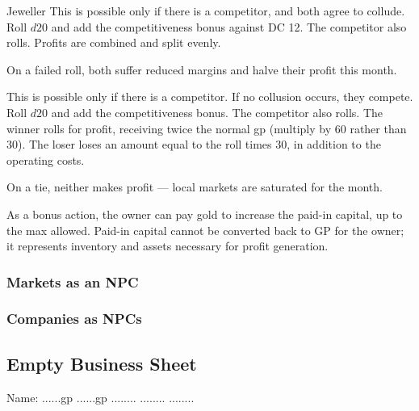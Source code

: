 \documentclass[twocolumn]{dndbook}
\begin{document}
\begin{DndMonster}[width=.5\textwidth - 8pt]{Jeweller}
	This is possible only if there is a competitor, and both agree to collude.
	Roll $d20$ and add the competitiveness bonus against DC 12.
	The competitor also rolls. Profits are combined and split evenly.\par
	On a failed roll, both suffer reduced margins and halve their profit this month.

	This is possible only if there is a competitor. If no collusion occurs, they compete.
	Roll $d20$ and add the competitiveness bonus.
	The competitor also rolls.
	The winner rolls for profit, receiving twice the normal gp (multiply by 60 rather than 30).
	The loser loses an amount equal to the roll times 30, in addition to the operating costs.\par
	On a tie, neither makes profit — local markets are saturated for the month.

	As a bonus action, the owner can pay gold to increase
	the paid-in capital, up to the max allowed.
	Paid-in capital cannot be converted back to GP for the owner; it represents inventory and assets necessary for profit generation.
\end{DndMonster}





\subsubsection{Markets as an NPC}



\subsubsection{Companies as NPCs}


\subsection{Empty Business Sheet}

\begin{DndMonster}[width=.5\textwidth - 8pt]{Name:}
	\hfill ......gp
	\hfill ......gp
	\hfill ........
	\hfill ........
	\hfill ........


\end{DndMonster}
\end{document}
